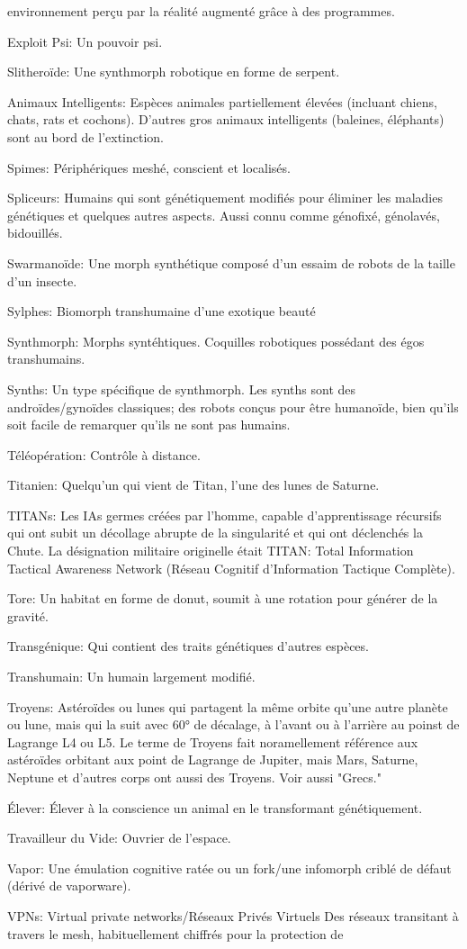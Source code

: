 environnement perçu par la réalité augmenté grâce à des programmes. \item Exploit Psi: Un pouvoir psi. \item Slitheroïde: Une synthmorph robotique en forme de serpent. \item Animaux Intelligents: Espèces animales partiellement élevées (incluant chiens, chats, rats et cochons). D'autres gros animaux intelligents (baleines, éléphants) sont au bord de l'extinction. \item Spimes: Périphériques meshé, conscient et localisés. \item Spliceurs: Humains qui sont génétiquement modifiés pour éliminer les maladies génétiques et quelques autres aspects. Aussi connu comme génofixé, génolavés, bidouillés. \item Swarmanoïde: Une morph synthétique composé d'un essaim de robots de la taille d'un insecte. \item Sylphes: Biomorph transhumaine d'une exotique beauté  \item Synthmorph: Morphs syntéhtiques. Coquilles robotiques possédant des égos transhumains. \item Synths: Un type spécifique de synthmorph. Les synths sont des androïdes/gynoïdes classiques; des robots conçus pour être humanoïde, bien qu'ils soit facile de remarquer qu'ils ne sont pas humains. \item Téléopération: Contrôle à distance. \item Titanien: Quelqu'un qui vient de Titan, l'une des lunes de Saturne. \item TITANs: Les IAs germes créées par l'homme, capable d'apprentissage récursifs qui ont subit un décollage abrupte de la singularité et qui ont déclenchés la Chute. La désignation militaire originelle était TITAN: Total Information Tactical Awareness Network (Réseau Cognitif d'Information Tactique Complète). \item Tore: Un habitat en forme de donut, soumit à une rotation pour générer de la gravité. \item Transgénique: Qui contient des traits génétiques d'autres espèces. \item Transhumain: Un humain largement modifié. \item Troyens: Astéroïdes ou lunes qui partagent la même orbite qu'une autre planète ou lune, mais qui la suit avec 60° de décalage, à l'avant ou à l'arrière au poinst de Lagrange L4 ou L5. Le terme de Troyens fait noramellement référence aux astéroïdes orbitant aux point de Lagrange de Jupiter, mais Mars, Saturne, Neptune et d'autres corps ont aussi des Troyens. Voir aussi "Grecs." \item Élever: Élever à la conscience un animal en le transformant génétiquement. \item Travailleur du Vide: Ouvrier de l'espace. \item Vapor: Une émulation cognitive ratée ou un fork/une infomorph criblé de défaut (dérivé de vaporware). \item VPNs: Virtual private networks/Réseaux Privés Virtuels Des réseaux transitant à travers le mesh, habituellement chiffrés pour la protection de 